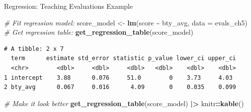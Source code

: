 \documentclass[
  ignorenonframetext,
]{beamer}
\newenvironment{Shaded}{\begin{snugshade}}{\end{snugshade}}
\newcommand{\AttributeTok}[1]{\textcolor[rgb]{0.13,0.29,0.53}{#1}}
\newcommand{\CommentTok}[1]{\textcolor[rgb]{0.56,0.35,0.01}{\textit{#1}}}
\newcommand{\FunctionTok}[1]{\textcolor[rgb]{0.13,0.29,0.53}{\textbf{#1}}}
\newcommand{\NormalTok}[1]{#1}
\newcommand{\OtherTok}[1]{\textcolor[rgb]{0.56,0.35,0.01}{#1}}
\newcommand{\SpecialCharTok}[1]{\textcolor[rgb]{0.81,0.36,0.00}{\textbf{#1}}}
\begin{document}
\begin{frame}[fragile]{Regression: Teaching Evaluations Example}
\protect{}\label{regression-teaching-evaluations-example-2}
\small

\begin{Shaded}
\begin{Highlighting}[]
\CommentTok{\# Fit regression model:}
\NormalTok{score\_model }\OtherTok{\textless{}{-}} \FunctionTok{lm}\NormalTok{(score }\SpecialCharTok{\textasciitilde{}}\NormalTok{ bty\_avg, }\AttributeTok{data =}\NormalTok{ evals\_ch5)}
\CommentTok{\# Get regression table:}
\FunctionTok{get\_regression\_table}\NormalTok{(score\_model)}
\end{Highlighting}
\end{Shaded}

\begin{verbatim}
# A tibble: 2 x 7
  term      estimate std_error statistic p_value lower_ci upper_ci
  <chr>        <dbl>     <dbl>     <dbl>   <dbl>    <dbl>    <dbl>
1 intercept    3.88      0.076     51.0        0    3.73     4.03 
2 bty_avg      0.067     0.016      4.09       0    0.035    0.099
\end{verbatim}

\begin{Shaded}
\begin{Highlighting}[]
\CommentTok{\# Make it look better}
\FunctionTok{get\_regression\_table}\NormalTok{(score\_model) }\SpecialCharTok{|\textgreater{}} 
\NormalTok{  knitr}\SpecialCharTok{::}\FunctionTok{kable}\NormalTok{()}
\end{Highlighting}
\end{Shaded}


\end{frame}
\end{document}
